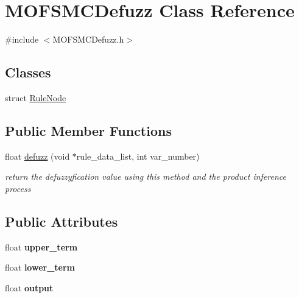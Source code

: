\hypertarget{classMOFSMCDefuzz}{\section{M\-O\-F\-S\-M\-C\-Defuzz Class Reference}
\label{classMOFSMCDefuzz}
}


{\ttfamily \#include $<$M\-O\-F\-S\-M\-C\-Defuzz.\-h$>$}

\subsection*{Classes}
\begin{DoxyCompactItemize}
\item 
struct \hyperlink{structMOFSMCDefuzz_1_1RuleNode}{Rule\-Node}
\end{DoxyCompactItemize}
\subsection*{Public Member Functions}
\begin{DoxyCompactItemize}
\item 
float \hyperlink{classMOFSMCDefuzz_a3ffd601f7763eb69eeb9c337da446592}{defuzz} (void $\ast$rule\-\_\-data\-\_\-list, int var\-\_\-number)
\begin{DoxyCompactList}\small\item\em return the defuzzyfication value using this method and the product inference process \end{DoxyCompactList}\end{DoxyCompactItemize}
\subsection*{Public Attributes}
\begin{DoxyCompactItemize}
\item 
\hypertarget{classMOFSMCDefuzz_a59768efc6ef3990e9f98b25283c14d2c}{float {\bfseries upper\-\_\-term}}\label{classMOFSMCDefuzz_a59768efc6ef3990e9f98b25283c14d2c}

\item 
\hypertarget{classMOFSMCDefuzz_a8d54b7078c79fbf822eaeef92302d496}{float {\bfseries lower\-\_\-term}}\label{classMOFSMCDefuzz_a8d54b7078c79fbf822eaeef92302d496}

\item 
\hypertarget{classMOFSMCDefuzz_a53a910b40a147b0b622436a13deee1d5}{float {\bfseries output}}\label{classMOFSMCDefuzz_a53a910b40a147b0b622436a13deee1d5}

\end{DoxyCompactItemize}



